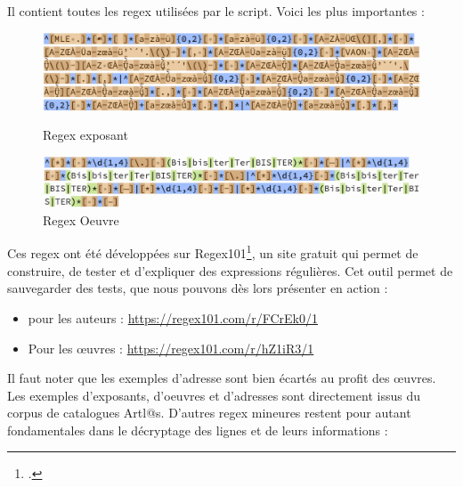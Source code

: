 \documentclass[a4paper,12pt,twoside]{book}
\begin{document}
Il contient toutes les regex utilisées par le script. Voici les plus importantes :\\
\begin{figure}[ht]
	\centering
	\includegraphics[scale=0.6]{regex_exposant.png}		
	\caption{Regex exposant}
\par
\vspace{1cm}
	\includegraphics[scale=0.6]{regex_oeuvre.png}		
	\caption{Regex Oeuvre}
\end{figure}

Ces regex ont été développées sur Regex101\footcite{Regex101}, un site gratuit qui permet de construire, de tester et d'expliquer des expressions régulières. Cet outil permet de sauvegarder des tests, que nous pouvons dès lors présenter en action :

\begin{itemize}
\item pour les auteurs : \url{https://regex101.com/r/FCrEk0/1}
\item Pour les œuvres : \url{https://regex101.com/r/hZ1iR3/1}
\end{itemize}

Il faut noter que les exemples d'adresse sont bien écartés au profit des œuvres. Les exemples d'exposants, d'oeuvres et d'adresses sont directement issus du corpus de catalogues Artl@s. D'autres regex mineures restent pour autant fondamentales dans le décryptage des lignes et de leurs informations : 

\end{document}
